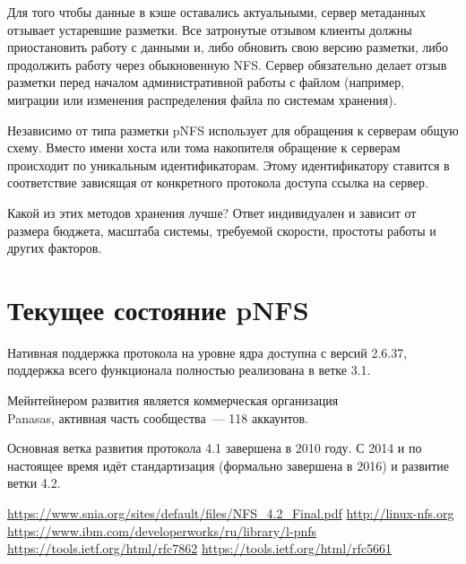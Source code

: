 \documentclass[10pt, a5paper]{article}
\begin{document}
Для того чтобы данные в кэше оставались актуальными, сервер метаданных отзывает устаревшие разметки. Все затронутые отзывом клиенты должны приостановить работу с данными и, либо обновить свою версию разметки, либо продолжить работу через обыкновенную NFS. Сервер обязательно делает отзыв разметки перед началом административной работы с файлом (например, миграции или изменения распределения файла по системам хранения).

Независимо от типа разметки pNFS использует для обращения к серверам общую схему. Вместо имени хоста или тома накопителя обращение к серверам происходит по уникальным идентификаторам. Этому идентификатору ставится в соответствие зависящая от конкретного протокола доступа ссылка на сервер.

Какой из этих методов хранения лучше? Ответ индивидуален и зависит от размера бюджета, масштаба системы, требуемой скорости, простоты работы и других факторов.

\section*{Текущее состояние pNFS}

Нативная поддержка протокола на уровне ядра доступна с версий
2.6.37, поддержка всего функционала полностью реализована в ветке 3.1.

Мейнтейнером развития является коммерческая организация \\Panasas,  активная часть сообщества~--- 118 аккаунтов.

Основная ветка развития протокола 4.1 завершена в 2010 году.
С 2014 и по настоящее время идёт стандартизация (формально завершена в 2016) и развитие  ветки 4.2.

\begin{thebibliography}{20}
   \url{https://www.snia.org/sites/default/files/NFS\_4.2\_Final.pdf}
   \url{http://linux-nfs.org}
   \url{https://www.ibm.com/developerworks/ru/library/l-pnfs}
   \url{https://tools.ietf.org/html/rfc7862}
   \url{https://tools.ietf.org/html/rfc5661}
\end{thebibliography}
\end{document}
